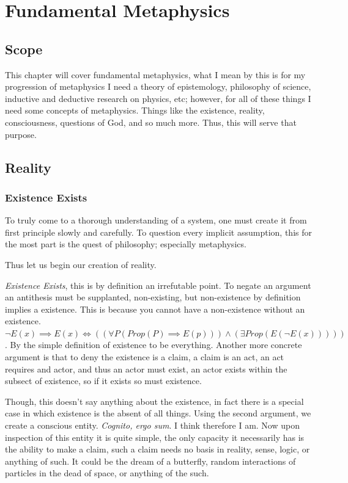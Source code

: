 \chapter{Fundamental Metaphysics}
\section{Scope}
This chapter will cover fundamental metaphysics, what I mean by this is for my progression of metaphysics I need a theory of epistemology, philosophy
of science, inductive and deductive research on physics, etc; however, for all of these things I need some concepts of metaphysics. Things like the
existence, reality, consciousness, questions of God, and so much more. Thus, this will serve that purpose.
\section{Reality}
\subsection{Existence Exists}

To truly come to a thorough understanding of a system, one must create it from first principle slowly and carefully. To question every implicit assumption,
this for the most part is the quest of philosophy; especially metaphysics.

Thus let us begin our creation of reality.

\emph{Existence Exists}, this is by definition an irrefutable point. To negate an argument an antithesis must be supplanted, non-existing, but non-existence by definition implies a existence.
This is because you cannot have a non-existence without an existence. $\neg E(x) \implies E(x) \iff ((\forall P(Prop(P) \implies E(p)) ) \land (\exists Prop(E(\neg E(x))))) $.
By the simple definition of existence to be everything. Another more concrete argument is that to deny the existence is a claim, a claim is an act, an act requires and actor, and thus an actor must exist,
an actor exists within the subsect of existence, so if it exists so must existence.

Though, this doesn't say anything about the existence, in fact there is a special case in which existence is the absent of all things. Using the second argument, we create
a conscious entity. \emph{Cognito, ergo sum}. I think therefore I am. Now upon inspection of this entity it is quite simple, the only capacity it necessarily has is
the ability to make a claim, such a claim needs no basis in reality, sense, logic, or anything of such. It could be the dream of a butterfly, random
interactions of particles in the dead of space, or anything of the such.

